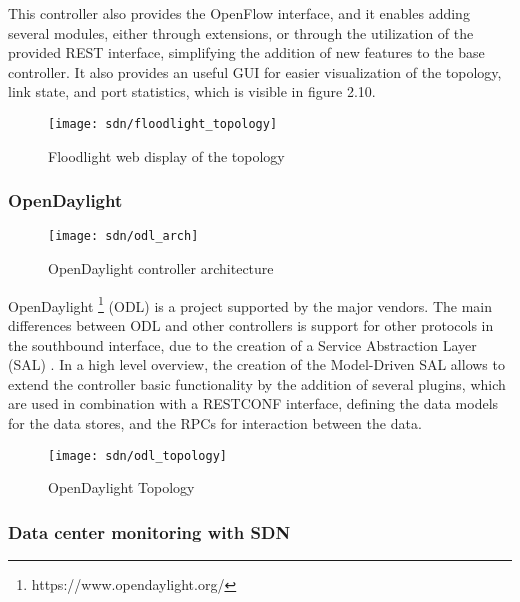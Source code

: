 \begin {enumerate}
\begin{enumerate}
\par This controller also provides the OpenFlow interface, and it enables adding several modules, either through extensions, or through the utilization of the
provided REST interface, simplifying the addition of new features to the base controller. It also provides an useful GUI for easier visualization of the topology,
link state, and port statistics, which is visible in figure 2.10.
 
\begin{figure}[H]
  \centering
  \texttt{[image: sdn/floodlight\_topology]}
  \label{fig:floodlight_gui}
  \caption{Floodlight web display of the topology}
\end{figure}

\subsubsection {OpenDaylight} \label{chap:odl}

\begin{figure}[H]
  \centering
  \texttt{[image: sdn/odl\_arch]}
  \label{fig:odl_arch}
  \caption {OpenDaylight controller architecture \cite{medved_opendaylight:_2014}}
\end{figure}

OpenDaylight \footnote{https://www.opendaylight.org/} (ODL) is a project supported by the major vendors. The main differences between ODL and other controllers
is support for other protocols in the southbound interface, due to the creation of a Service Abstraction Layer (SAL) \cite{medved_opendaylight:_2014}. In a high 
level overview, the creation of the Model-Driven SAL allows to extend the controller basic functionality by the addition of several plugins, which are used in
combination with a RESTCONF \cite{bierman_restconf_2017} interface, defining the data models for the data stores, and the RPCs for interaction between the data.

\begin{figure}[H]
  \centering
  \texttt{[image: sdn/odl\_topology]}
  \label{fig:odl_topo}
  \caption {OpenDaylight Topology}
\end{figure}

\subsubsection {Data center monitoring with SDN}


\end{enumerate}
\end{enumerate}

